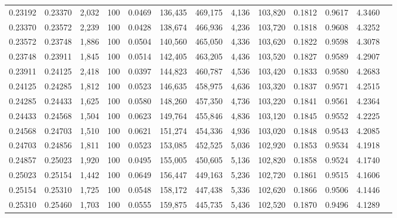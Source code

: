 \begin{tabular}{rrrrrrrrrrrrr}
0.23192 & 0.23370 & 2,032 & 100 &                                     0.0469 & 136,435 & 469,175 &   4,136 & 103,820 & 0.1812 & 0.9617 & 4.3460 \\
0.23370 & 0.23572 & 2,239 & 100 &                                     0.0428 & 138,674 & 466,936 &   4,236 & 103,720 & 0.1818 & 0.9608 & 4.3252 \\
0.23572 & 0.23748 & 1,886 & 100 &                                     0.0504 & 140,560 & 465,050 &   4,336 & 103,620 & 0.1822 & 0.9598 & 4.3078 \\
0.23748 & 0.23911 & 1,845 & 100 &                                     0.0514 & 142,405 & 463,205 &   4,436 & 103,520 & 0.1827 & 0.9589 & 4.2907 \\
0.23911 & 0.24125 & 2,418 & 100 &                                     0.0397 & 144,823 & 460,787 &   4,536 & 103,420 & 0.1833 & 0.9580 & 4.2683 \\
0.24125 & 0.24285 & 1,812 & 100 &                                     0.0523 & 146,635 & 458,975 &   4,636 & 103,320 & 0.1837 & 0.9571 & 4.2515 \\
0.24285 & 0.24433 & 1,625 & 100 &                                     0.0580 & 148,260 & 457,350 &   4,736 & 103,220 & 0.1841 & 0.9561 & 4.2364 \\
0.24433 & 0.24568 & 1,504 & 100 &                                     0.0623 & 149,764 & 455,846 &   4,836 & 103,120 & 0.1845 & 0.9552 & 4.2225 \\
0.24568 & 0.24703 & 1,510 & 100 &                                     0.0621 & 151,274 & 454,336 &   4,936 & 103,020 & 0.1848 & 0.9543 & 4.2085 \\
0.24703 & 0.24856 & 1,811 & 100 &                                     0.0523 & 153,085 & 452,525 &   5,036 & 102,920 & 0.1853 & 0.9534 & 4.1918 \\
0.24857 & 0.25023 & 1,920 & 100 &                                     0.0495 & 155,005 & 450,605 &   5,136 & 102,820 & 0.1858 & 0.9524 & 4.1740 \\
0.25023 & 0.25154 & 1,442 & 100 &                                     0.0649 & 156,447 & 449,163 &   5,236 & 102,720 & 0.1861 & 0.9515 & 4.1606 \\
0.25154 & 0.25310 & 1,725 & 100 &                                     0.0548 & 158,172 & 447,438 &   5,336 & 102,620 & 0.1866 & 0.9506 & 4.1446 \\
0.25310 & 0.25460 & 1,703 & 100 &                                     0.0555 & 159,875 & 445,735 &   5,436 & 102,520 & 0.1870 & 0.9496 & 4.1289 \\

\end{tabular}

